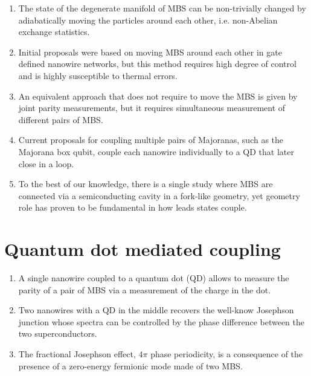 \begin{enumerate}
\item The state of the degenerate manifold of MBS can be non-trivially changed by adiabatically moving the particles around each other, i.e. non-Abelian exchange statistics.
\item Initial proposals were based on moving MBS around each other in gate defined nanowire networks\cite{Alicea2011}, but this method requires high degree of control and is highly susceptible to thermal errors\cite{Pedrocchi2015}.
\item An equivalent approach that does not require to move the MBS is given by joint parity measurements\cite{Bonderson2008}, but it requires simultaneous measurement of different pairs of MBS.
\item Current proposals for coupling multiple pairs of Majoranas, such as the Majorana box qubit\cite{Plugge2017}, couple each nanowire individually to a QD that later close in a loop.
\item To the best of our knowledge, there is a single study\cite{Hell2016} where MBS are connected via a semiconducting cavity in a fork-like geometry, yet geometry role has proven to be fundamental in how leads states couple\cite{Wirtz1997}.
\end{enumerate}

\section{Quantum dot mediated coupling}

\begin{enumerate}
\item A single nanowire coupled to a quantum dot (QD) allows to measure the parity of a pair of MBS via a measurement of the charge in the dot.
\item Two nanowires with a QD in the middle recovers the well-know Josephson junction whose spectra can be controlled by the phase difference between the two superconductors.
\item The fractional Josephson effect, $4\pi$ phase periodicity, is a consequence of the presence of a zero-energy fermionic mode made of two MBS.

\end{enumerate}

